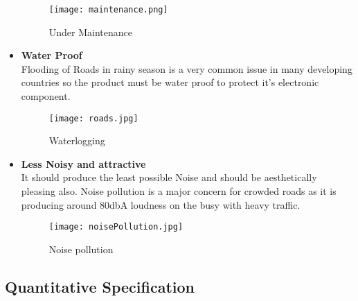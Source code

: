 \documentclass[12pt]{article}
\begin{document}
\begin{itemize}
\begin{figure}[!htb]
\centering
\texttt{[image: maintenance.png]}
\caption{\label{fig:}Under Maintenance}
\end{figure}

\item \textbf{Water Proof} \\
Flooding of Roads in rainy season is a very common issue in many developing countries so the product must be water proof to protect it's electronic component.

\begin{figure}[!htb]
\centering
\texttt{[image: roads.jpg]}
\caption{\label{fig:}Waterlogging}
\end{figure}

\item \textbf{Less Noisy and attractive} \\

It should produce the least possible Noise and should be aesthetically pleasing also. Noise pollution is a major concern for crowded roads as it is producing around 80dbA loudness on the busy with heavy traffic. 

\newpage

\begin{figure}
\centering
\texttt{[image: noisePollution.jpg]}
\caption{\label{fig:}Noise pollution}
\end{figure}
\end{itemize}

\subsection{Quantitative Specification}
\end{document}
